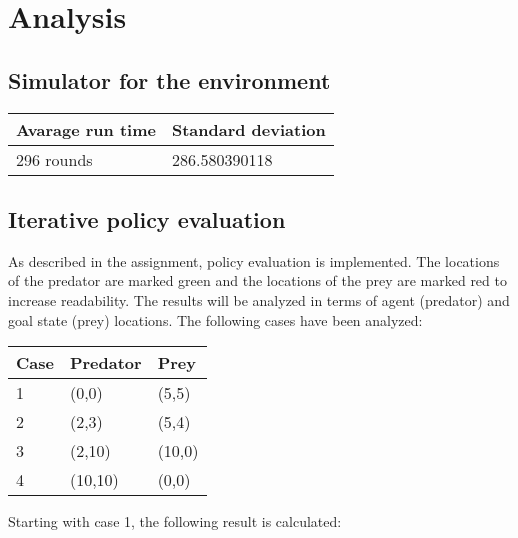 \documentclass{article}
\begin{document}
\section*{Analysis}


\subsection*{Simulator for the environment}


\begin{center}
	\begin{tabular}{  l ||  l }
		Avarage run time & Standard deviation \\ 
		\hline
		296 rounds &  286.580390118 %
	\end{tabular}
\end{center}

\subsection*{Iterative policy evaluation}
As described in the assignment, policy evaluation is implemented. The locations of the predator are marked green and the locations of the prey are marked red to increase readability. The results will be analyzed in terms of agent (predator) and goal state (prey) locations. The following cases have been analyzed:
\begin{center}
	\begin{tabular}{ | l | l | l |}
	\hline
	Case & Predator & Prey\\
	\hline
	1 & (0,0) & (5,5)\\ 
	\hline
	2 & (2,3) & (5,4)\\ 
	\hline
	3 & (2,10) & (10,0)\\ 
	\hline
	4 & (10,10) & (0,0)\\ 
	\hline
	\end{tabular}
\end{center}

Starting with case 1, the following result is calculated:
\end{document}
